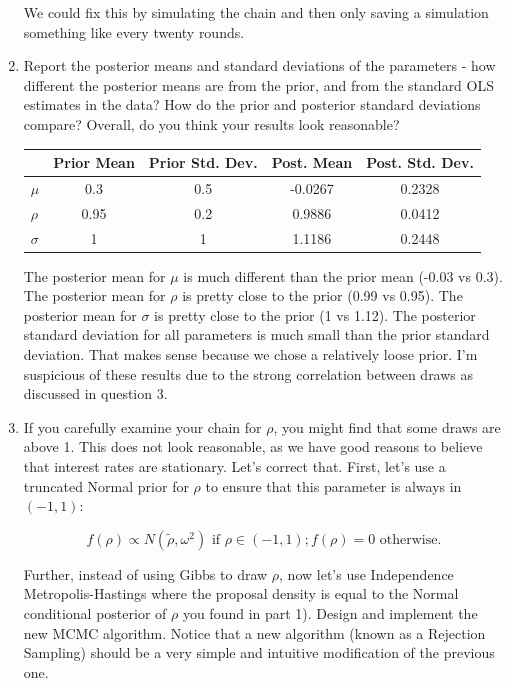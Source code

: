 \documentclass{article}
\begin{document}
\begin{enumerate}
\begin{center}
\end{center}

We could fix this by simulating the chain and then only saving a simulation something like every twenty rounds.


\item Report the posterior means and standard deviations of the parameters - how different the
posterior means are from the prior, and from the standard OLS estimates in the data? How
do the prior and posterior standard deviations compare? Overall, do you think your results
look reasonable?

\begin{center}
\begin{tabular}{ l | c c c c}
& Prior Mean & Prior Std. Dev. & Post. Mean & Post. Std. Dev.  \\ 
\hline
 $\mu$  & 0.3 & 0.5 & -0.0267 & 0.2328 \\  
 $\rho$ & 0.95 & 0.2 & 0.9886 & 0.0412 \\
 $\sigma$ & 1 & 1 & 1.1186 & 0.2448
\end{tabular}
\end{center}

The posterior mean for $\mu$ is much different than the prior mean (-0.03 vs 0.3).  The posterior mean for $\rho$ is pretty close to the prior (0.99 vs 0.95).  The posterior mean for $\sigma$ is pretty close to the prior (1 vs 1.12).  The posterior standard deviation for all parameters is much small than the prior standard deviation.  That makes sense because we chose a relatively loose prior.  I'm suspicious of these results due to the strong correlation between draws as discussed in question 3.

\item  If you carefully examine your chain for $\rho$, you might find that some draws are above 1. This
does not look reasonable, as we have good reasons to believe that interest rates are stationary.
Let's correct that. First, let's use a truncated Normal prior for $\rho$ to ensure that this parameter
is always in $(-1, 1)$:

$$
f(\rho) \propto N (\tilde\rho, \omega^2) \text{ if } \rho \in (-1, 1); f(\rho) = 0 \text{ otherwise}.
$$

Further, instead of using Gibbs to draw $\rho$, now let's use Independence Metropolis-Hastings
where the proposal density is equal to the Normal conditional posterior of $\rho$ you found in part 1). Design and implement the new MCMC algorithm. Notice that a new algorithm (known
as a Rejection Sampling) should be a very simple and intuitive modification of the previous
one.


\end{enumerate}
\end{document}
